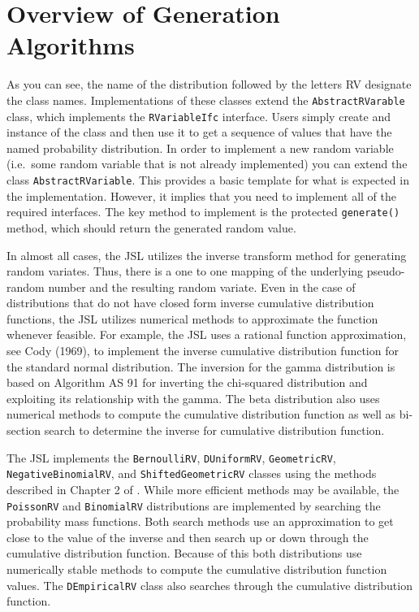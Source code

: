 \documentclass[
]{book}
\theoremstyle{definition}
\theoremstyle{definition}
\theoremstyle{definition}
\theoremstyle{definition}
\theoremstyle{remark}
\begin{document}
\hypertarget{overview-of-generation-algorithms}{%
\section{Overview of Generation Algorithms}\label{overview-of-generation-algorithms}}

As you can see, the name of the distribution followed by the letters RV designate the class names. Implementations of these classes extend the \texttt{AbstractRVarable} class, which implements the \texttt{RVariableIfc} interface. Users simply create and instance of the class and then use it to get a sequence of values that have the named probability distribution. In order to implement a new random variable (i.e.~some random variable
that is not already implemented) you can extend the class
\texttt{AbstractRVariable}. This provides a basic template for what is expected
in the implementation. However, it implies that you need to implement
all of the required interfaces. The key method to implement is the
protected \texttt{generate()} method, which should return the generated random
value.

In almost all cases, the JSL utilizes the inverse transform method for generating random variates. Thus, there is a one to one mapping of the underlying pseudo-random number and the resulting random variate. Even in the case of distributions that do not have closed form inverse cumulative distribution functions, the JSL utilizes numerical methods to approximate the function whenever feasible. For example, the JSL uses a rational function approximation, see Cody (1969), to
implement the inverse cumulative distribution function for the standard
normal distribution. The inversion for the gamma distribution is based
on Algorithm AS 91 for inverting the chi-squared distribution and
exploiting its relationship with the gamma. The beta distribution also
uses numerical methods to compute the cumulative distribution function
as well as bi-section search to determine the inverse for cumulative
distribution function.

The JSL implements the \texttt{BernoulliRV}, \texttt{DUniformRV}, \texttt{GeometricRV},
\texttt{NegativeBinomialRV}, and \texttt{ShiftedGeometricRV} classes using the methods
described in Chapter 2 of \citet{Rossetti2015}. While more efficient methods may be available, the
\texttt{PoissonRV} and \texttt{BinomialRV} distributions are implemented by searching the
probability mass functions. Both search methods use an approximation to
get close to the value of the inverse and then search up or down through
the cumulative distribution function. Because of this both distributions
use numerically stable methods to compute the cumulative distribution
function values. The \texttt{DEmpiricalRV} class also searches through the
cumulative distribution function.
\end{document}

